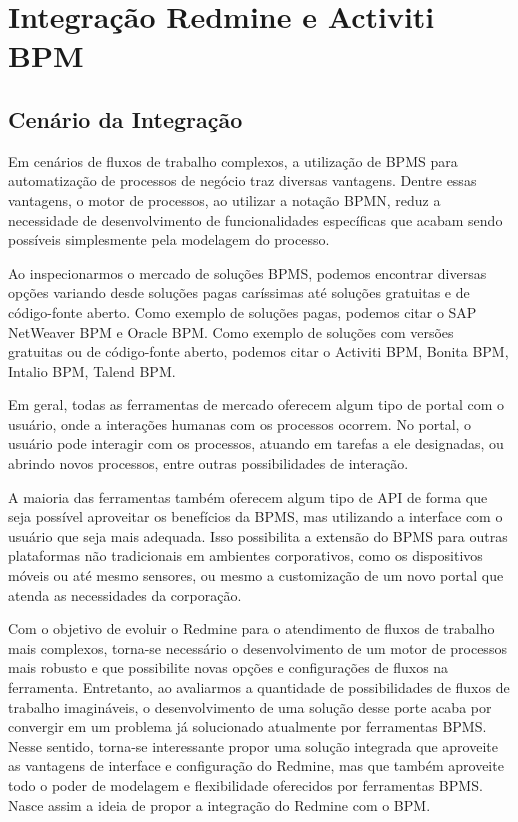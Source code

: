 \chapter{Integração Redmine e Activiti BPM}\label{chp:integracao_redmine_activiti}


\section{Cenário da Integração}\label{sec:cenario-integracao}

Em cenários de fluxos de trabalho complexos, a utilização de BPMS para automatização de processos de negócio traz diversas vantagens. Dentre essas vantagens, o motor de processos, ao utilizar a notação BPMN, reduz a necessidade de desenvolvimento de funcionalidades específicas que acabam sendo possíveis simplesmente pela modelagem do processo.

Ao inspecionarmos o mercado de soluções BPMS, podemos encontrar diversas opções variando desde soluções pagas caríssimas até soluções gratuitas e de código-fonte aberto. Como exemplo de soluções pagas, podemos citar o SAP NetWeaver BPM e Oracle BPM. Como exemplo de soluções com versões gratuitas ou de código-fonte aberto, podemos citar o Activiti BPM, Bonita BPM, Intalio BPM, Talend BPM.

Em geral, todas as ferramentas de mercado oferecem algum tipo de portal com o usuário, onde a interações humanas com os processos ocorrem. No portal, o usuário pode interagir com os processos, atuando em tarefas a ele designadas, ou abrindo novos processos, entre outras possibilidades de interação. 

A maioria das ferramentas também oferecem algum tipo de API de forma que seja possível aproveitar os benefícios da BPMS, mas utilizando a interface com o usuário que seja mais adequada. Isso possibilita a extensão do BPMS para outras plataformas não tradicionais em ambientes corporativos, como os dispositivos móveis ou até mesmo sensores, ou mesmo a customização de um novo portal que atenda as necessidades da corporação.

Com o objetivo de evoluir o Redmine para o atendimento de fluxos de trabalho mais complexos, torna-se necessário o desenvolvimento de um motor de processos mais robusto e que possibilite novas opções e configurações de fluxos na ferramenta. Entretanto, ao avaliarmos a quantidade de possibilidades de fluxos de trabalho imagináveis, o desenvolvimento de uma solução desse porte acaba por convergir em um problema já solucionado atualmente por ferramentas BPMS. Nesse sentido, torna-se interessante propor uma solução integrada que aproveite as vantagens de interface e configuração do Redmine, mas que também aproveite todo o poder de modelagem e flexibilidade oferecidos por ferramentas BPMS. Nasce assim a ideia de propor a integração do Redmine com o BPM.

